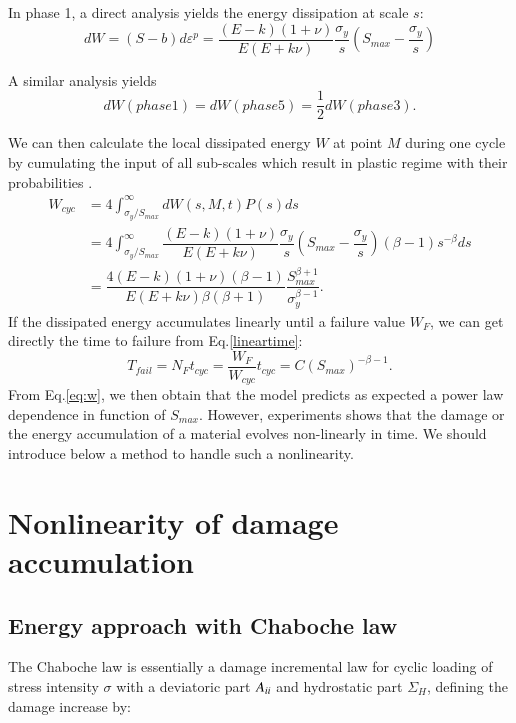 \documentclass[3p,times,number,review]{elsarticle}
\begin{document}
In phase 1, a direct analysis yields the energy dissipation at scale $s$:
\begin{equation}dW=(S-b)d\varepsilon^p=\dfrac{(E-k)(1+\nu) }{E(E+k\nu)}\dfrac{ \sigma_y}{s}\left(S_{max}-\dfrac{ \sigma_y}{s}\right)
\label{dw}
\end{equation}

A similar analysis yields $$dW(phase 1)=dW(phase 5)=\dfrac{1}{2}dW(phase 3).$$

We can then calculate  the local dissipated energy $W$  at point $M$ during one cycle by cumulating the input of all sub-scales which result in plastic regime with their probabilities \cite{zepeng}.
\begin{equation}
\begin{split}
W_{cyc}&=4\int_{ \sigma_y /S_{max}}^{\infty}dW(s,M,t)P(s)ds
\\&=4\int_{ \sigma_y /S_{max}}^{\infty}\dfrac{(E-k)(1+\nu) }{E(E+k\nu)}\dfrac{ \sigma_y}{s}\left(S_{max}-\dfrac{ \sigma_y}{s}\right)\left( \beta-1\right) s^{-\beta}ds
\\&=\dfrac{4(E-k)(1+\nu)\left( \beta-1\right) }{ E(E+k\nu)\beta\left( \beta+1\right) }\dfrac{S_{max}^{\beta+1}}{ \sigma_y^{\beta-1}}.
\end{split}
\label{eq:w}
\end{equation}
 If the dissipated energy accumulates linearly until a failure value $W_F$, we can get directly the time to failure from Eq.\eqref{lineartime}:
\begin{equation}
T_{fail}=N_{F}t_{cyc}=\dfrac{W_F}{W_{cyc}}t_{cyc}=C(S_{max})^{-\beta-1}.
\label{lineartime}
\end{equation}
From Eq.\eqref{eq:w}, we then obtain that the model predicts as expected a power law dependence in function of $S_{max}$.
However, experiments shows that the damage or the energy accumulation of a material evolves non-linearly in time. We should introduce below a method to handle such a nonlinearity.

\section{Nonlinearity of damage accumulation}
\subsection{Energy approach with Chaboche law}
The Chaboche law\cite{lemaitre1990mechanics} is essentially a damage incremental law for cyclic loading of stress intensity $\sigma$ with a deviatoric part ${A}_{\uppercase\expandafter{\romannumeral2}}$ and hydrostatic part $\Sigma_H$, defining the damage increase by:
\end{document}
